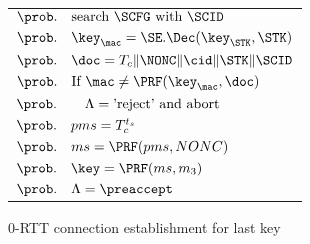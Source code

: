 \begin{figure*}[htb]
\begin{center}
{\begin{minipage}[t]{0.39\textwidth}
\begin{tabular}[c]{l}
 $\prob.\quad \text{search $\SCFG$ with $\SCID$}$ \\
 $\prob.\quad \key_{\mac} = \SE.\Dec(\key_{\STK}, \STK) $\\
 $\prob.\quad \doc = T_c \| \NONC \| \cid \| \STK \| \SCID$ \\
 $\prob.\quad \text{If }\mac \neq \PRF(\key_{\mac}, \doc)$ \\
 $\prob.\quad \quad \Lambda = \text{'reject' and abort}$ \\
 $\prob.\quad pms = T_c^{t_s}$ \\
 $\prob.\quad ms = \PRF(pms, NONC)$ \\
 $\prob.\quad \key = \PRF(ms, m_3)$ \\
 $\prob.\quad \Lambda = \preaccept$ \\
\end{tabular}
\end{minipage}%
} \vspace{10pt}

0-RTT connection establishment for last key
\vspace{10pt}\\


\end{center}
\end{figure*}
